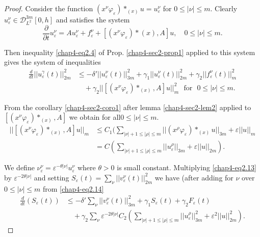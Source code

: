\begin{proof}
Consider the function $(x^\nu \varphi_\varepsilon) *_{(x)} u =
u^\nu_{\varepsilon}$ for $0\leq|\nu|\leq m$. Clearly
$u^\nu_\varepsilon \in \mathscr{D}^{3m}_{L^2}  [0, h]$ and
satisfies the system  
\begin{equation*}
\frac{\partial}{\partial t} u^\nu_{\varepsilon} = Au^\nu_\varepsilon +
f^\nu_\varepsilon + [ (x^\nu \varphi_\varepsilon) *(x), A] u, \quad
0 \leq |\nu |\leq m.   \tag{2.12}\label{chap4-eq2.12}
\end{equation*}

Then  inequality \eqref{chap4-eq2.4} of Prop. \ref{chap4-sec2-prop1}
applied to this system gives the system of inequalities  
\begin{align*}
\frac{d}{dt} || u^\gamma_\varepsilon (t) ||^2_{2m} & \leq - \delta' ||
u^\nu_\varepsilon (t)||^2_{3m} + \gamma_1 || u^\nu_\varepsilon
(t)||^2_{2m} + \gamma_2 || 
f^\nu_\varepsilon (t) ||^2_m \\
& \quad  + \gamma_2 || [ (x^\nu
  \varphi_\varepsilon )* _{(x)}, A ] u ||^2_m \text{~ for~ } 0 \leq |
\nu | \leq m. \tag{2.13}\label{chap4-eq2.13} 
\end{align*}

From the corollary \ref{chap4-sec2-coro1} after lemma
\ref{chap4-sec2-lem2} applied to $[(x^\nu 
  \varphi_\varepsilon) *_{(x)}, A]$ we obtain for all\pageoriginale $0
\leq |\nu| \leq m$.   
\begin{align*}
|| [ (x^\nu \varphi_\varepsilon )*_{(x)}, A] u ||_m & \leq C_1
\Big(\sum_{|\nu|+1 \leq|\rho|\leq m} || (x^\rho \varphi_\varepsilon )
*_{(x)} u ||_{ 3m } +  \varepsilon || u ||_m\\ 
 & =C\left(\sum\limits_{|\nu|+1\leq|\rho|\leq m} || u^\rho_\varepsilon
||_{ 3 m} + \varepsilon || u ||_{2m}\right).\tag{2.14}\label{chap4-eq2.14} 
\end{align*}

We define $\nu^\nu_\varepsilon =
\varepsilon^{-\theta|\nu|}u_\varepsilon^\nu$ where $\theta > 0$ is
small constant. Multiplying \eqref{chap4-eq2.13}  by $\varepsilon^{-2
  \theta |\nu|}$ 
and setting $S_\varepsilon(t) = \sum\limits_\nu ||
v^\nu_\varepsilon(t)||^2_{2m}$ we have (after adding for $\nu$ over $0
\leq|\nu|\leq m$ from \eqref{chap4-eq2.14} 
\begin{align*}
\frac{d}{dt} (S_\varepsilon (t)) &\leq -\delta' \sum_\nu ||
v_\varepsilon^\nu (t) ||^2_{3m} + \gamma_1 S_\varepsilon (t) +
\gamma_2 F_\varepsilon (t) \\
&\quad + \gamma_2 \sum_\nu \varepsilon^{-2 \theta |\nu |} C_2
(\sum_{|\nu|+1\leq |\rho |\leq m} ||  
u^\rho_\varepsilon ||^2_{3m} + \varepsilon^2 || u
||^2_{2m}). \tag{2.15}  \label{chap4-eq2.15}
\end{align*}


\end{proof}
